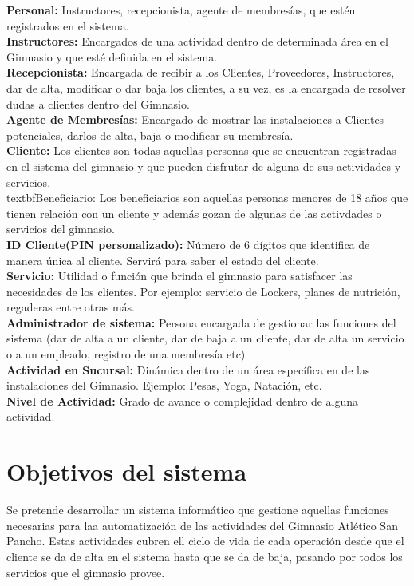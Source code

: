 \textbf{Personal:} Instructores, recepcionista, agente de membres\'ias, que est\'en registrados en el sistema.\\

\textbf{Instructores:} Encargados de una actividad dentro de determinada \'area en el Gimnasio y que est\'e definida en el sistema.\\

\textbf{Recepcionista: }Encargada de recibir a los Clientes, Proveedores, Instructores, dar de alta, modificar o dar baja los clientes, a su vez, es la encargada de resolver dudas a clientes dentro del Gimnasio.\\

\textbf{Agente de Membresías:} Encargado de mostrar las instalaciones a Clientes potenciales, darlos de alta, baja o modificar su membres\'ia.\\

\textbf{Cliente:} Los clientes son todas aquellas personas que se encuentran registradas en el sistema del gimnasio y que pueden disfrutar de alguna de sus actividades y servicios.\\

textbf{Beneficiario:} Los beneficiarios son aquellas personas menores de 18 años que tienen relación con un cliente y además gozan de algunas de las activdades o servicios del gimnasio.\\

\textbf{ID Cliente(PIN personalizado):} Número  de 6 d\'igitos que identifica de manera \'unica al cliente. Servir\'a para saber el estado del cliente.\\

\textbf{Servicio: }Utilidad o funci\'on que brinda el gimnasio para satisfacer las necesidades de los clientes. Por ejemplo: servicio de Lockers, planes de nutrici\'on, regaderas entre otras m\'as.\\

\textbf{Administrador de sistema: }Persona encargada de gestionar las funciones del sistema (dar de alta a un cliente, dar de baja a un cliente, dar de alta un servicio o a un empleado, registro de una membres\'ia etc)\\

\textbf{Actividad en Sucursal: }Din\'amica dentro de un \'area espec\'ifica en de las instalaciones del Gimnasio. Ejemplo: Pesas, Yoga, Natación, etc.\\

\textbf{Nivel de Actividad:} Grado de avance o complejidad dentro de alguna actividad.

\section{Objetivos del sistema}
Se pretende desarrollar un sistema inform\'atico que gestione aquellas funciones necesarias para laa automatizaci\'on de las actividades del Gimnasio Atl\'etico San Pancho. Estas actividades cubren ell ciclo de vida de cada operaci\'on desde que el cliente se da de alta en el sistema hasta que se da de baja, pasando por todos los servicios que el gimnasio provee.
\clearedoublepage
